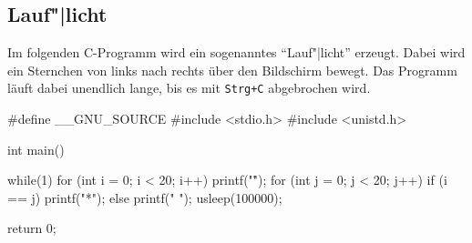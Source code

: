 \subsection{Lauf"|licht}
\label{sec:c:lauflicht}

Im folgenden C-Programm wird ein sogenanntes ``Lauf"|licht'' erzeugt. Dabei wird ein Sternchen von links nach rechts über den Bildschirm bewegt. Das Programm läuft dabei unendlich lange, bis es mit \texttt{Strg+C} abgebrochen wird.

\begin{code}
#define __GNU_SOURCE
#include <stdio.h>
#include <unistd.h>

int main() {
    while(1) {
        for (int i = 0; i < 20; i++) {
            printf("\r");
            for (int j = 0; j < 20; j++) {
                if (i == j)
                    printf("*");
                else
                    printf(" ");
            }
            usleep(100000);
        }
    }

    return 0;
}
\end{code}
